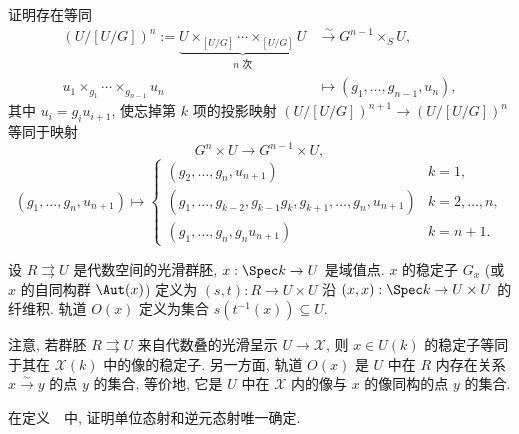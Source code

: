 \begin{exercise}\label{src:4.4.6}
证明存在等同
\[
\begin{aligned}
(U/[U/G])^n:=\underbrace{U\times_{[U/G]}\cdots\times_{[U/G]}U}_{n\text{ 次}}&\xrightarrow{\sim}G^{n-1}\times_S U,\\
u_1\times_{g_1}\cdots\times_{g_{n-1}}u_n&\longmapsto(g_1,\ldots,g_{n-1},u_n),
\end{aligned}
\]
其中 $u_i=g_i u_{i+1}$, 使忘掉第 $k$ 项的投影映射 $(U/[U/G])^{n+1}\to(U/[U/G])^n$ 等同于映射
\[
G^n\times U\longrightarrow G^{n-1}\times U,
\]
\[
(g_1,\ldots,g_n,u_{n+1})\longmapsto
\begin{cases}
(g_2,\ldots,g_n,u_{n+1})&k=1,\\
(g_1,\ldots,g_{k-2},g_{k-1}g_k,g_{k+1},\ldots,g_n,u_{n+1})&k=2,\ldots,n,\\
(g_1,\ldots,g_n,g_nu_{n+1})&k=n+1.
\end{cases}
\]
\end{exercise}
\begin{definition}[轨道与稳定子]\label{src:4.4.7}
设 $R\rightrightarrows U$ 是代数空间的光滑群胚, $x:\Spec k\to U$ 是域值点. $x$ 的稳定子 $G_x$ (或 $x$ 的自同构群 $\Aut(x)$) 定义为 $(s,t):R\to U\times U$ 沿 $(x,x):\Spec k\to U\times U$ 的纤维积. 轨道 $O(x)$ 定义为集合 $s(t^{-1}(x))\subseteq U$.
\end{definition}
\begin{remark}\label{src:4.4.8}
注意, 若群胚 $R\rightrightarrows U$ 来自代数叠的光滑呈示 $U\to\mathcal X$, 则 $x\in U(k)$ 的稳定子等同于其在 $\mathcal X(k)$ 中的像的稳定子. 另一方面, 轨道 $O(x)$ 是 $U$ 中在 $R$ 内存在关系 $x\xrightarrow{\sim}y$ 的点 $y$ 的集合, 等价地, 它是 $U$ 中在 $\mathcal X$ 内的像与 $x$ 的像同构的点 $y$ 的集合.
\end{remark}
\begin{exercise}[不重要]\label{src:4.4.9}
在定义~~中, 证明单位态射和逆元态射唯一确定.
\end{exercise}
